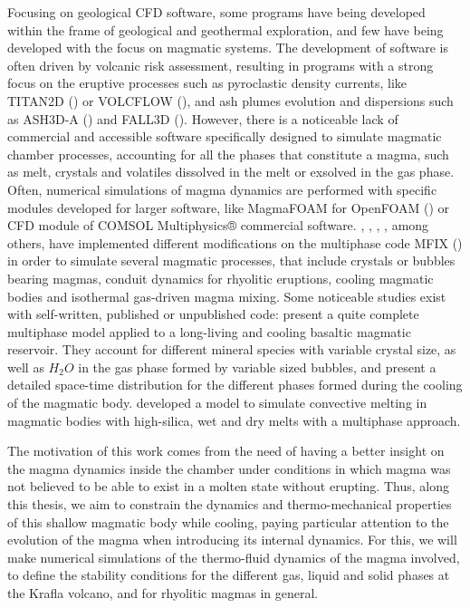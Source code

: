 Focusing on geological CFD software, some programs have being developed within the frame of geological and geothermal exploration, and few have being developed with the focus on magmatic systems. The development of software is often driven by volcanic risk assessment, resulting in programs with a strong focus on the eruptive processes such as pyroclastic density currents, like TITAN2D (\cite{titan2d2005}) or VOLCFLOW (\cite{volcflow}), and ash plumes evolution and dispersions such as ASH3D-A (\cite{mastin2013}) and FALL3D (\cite{costa2006}). However, there is a noticeable lack of commercial and accessible software specifically designed to simulate magmatic chamber processes, accounting for all the phases that constitute a magma, such as melt, crystals and volatiles dissolved in the melt or exsolved in the gas phase. Often, numerical simulations of magma dynamics are performed with specific modules developed for larger software, like MagmaFOAM for OpenFOAM (\cite{magmaFOAM2022}) or CFD module of COMSOL Multiphysics® commercial software.  \cite{dufek2005}, \cite{ruprecht2008}, \cite{dufek2010}, \cite{molina2012}, among others, have implemented different modifications on the multiphase code MFIX (\cite{syamlal1993}) in order to simulate several magmatic processes, that include crystals or bubbles bearing magmas, conduit dynamics for rhyolitic eruptions, cooling magmatic bodies and isothermal gas-driven magma mixing. Some noticeable studies exist with self-written, published or unpublished code: \cite{gutierrez&parada} present a quite complete multiphase model applied to a long-living and cooling basaltic magmatic reservoir. They account for different mineral species with variable crystal size, as well as $H_2O$ in the gas phase formed by variable sized bubbles, and present a detailed space-time distribution for the different phases formed during the cooling of the magmatic body.
\cite{simakin2012, simakin2022} developed a model to simulate convective melting in magmatic bodies with high-silica, wet and dry melts with a multiphase approach.

The motivation of this work comes from the need of having a better insight on the magma dynamics inside the chamber under conditions in which magma was not believed to be able to exist in a molten state without erupting. Thus, along this thesis, we aim to constrain the dynamics and thermo-mechanical properties of this shallow magmatic body while cooling, paying particular attention to the evolution of the magma when introducing its internal dynamics. For this, we will make numerical simulations of the thermo-fluid dynamics of the magma involved, to define the stability conditions for the different gas, liquid and solid phases at the Krafla volcano, and for rhyolitic magmas in general.

